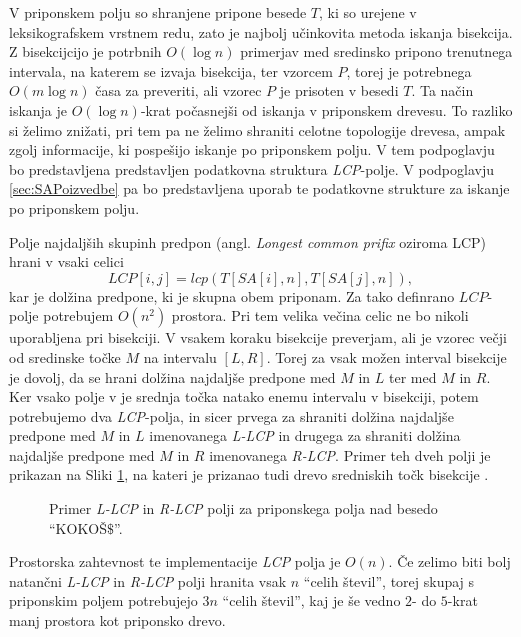 V priponskem polju so shranjene pripone besede $T$, ki so urejene v leksikografskem vrstnem redu, zato je najbolj učinkovita metoda iskanja bisekcija. Z bisekcijcijo je potrbnih $O(\log{n})$ primerjav med sredinsko pripono trenutnega intervala, na katerem se izvaja bisekcija, ter vzorcem $P$, torej je potrebnega $O(m\log{n})$ časa za preveriti, ali vzorec $P$ je prisoten v besedi $T$. Ta način iskanja je $O(\log{n})$-krat počasnejši od iskanja v priponskem drevesu. To razliko si želimo znižati, pri tem pa ne želimo shraniti celotne topologije drevesa, ampak zgolj informacije, ki pospešijo iskanje po priponskem polju. V tem podpoglavju bo predstavljena predstavljen podatkovna struktura \textit{LCP}-polje. V podpoglavju \ref{sec:SAPoizvedbe} pa bo predstavljena uporab te podatkovne strukture za iskanje po priponskem polju.

Polje najdaljših skupinh predpon (angl. \textit{Longest common prifix} oziroma LCP) hrani v vsaki celici 
    $$\textit{LCP}[i,j]=lcp(T[SA[i],n],T[SA[j],n]),$$
kar je dolžina predpone, ki je skupna obem priponam. Za tako definrano $LCP$-polje potrebujem $O(n^2)$ prostora. Pri tem velika večina celic ne bo nikoli uporabljena pri bisekciji. V vsakem koraku bisekcije preverjam, ali je vzorec večji od sredinske točke $M$ na intervalu $[L,R]$. Torej za vsak možen interval bisekcije je dovolj, da se hrani dolžina najdaljše predpone med $M$ in $L$ ter med $M$ in $R$. Ker vsako polje v je srednja točka natako enemu intervalu v bisekciji, potem potrebujemo dva \textit{LCP}-polja, in sicer prvega za shraniti dolžina najdaljše predpone med $M$ in $L$ imenovanega \textit{L-LCP} in drugega za shraniti dolžina najdaljše predpone med $M$ in $R$ imenovanega \textit{R-LCP}. Primer teh dveh polji je prikazan na Sliki \ref{fig:RlcpLlcpSuffuxArray}, na kateri je prizanao tudi drevo sredniskih točk bisekcije \cite{Manber1990}. 

\begin{figure}[htb] 
    
    \centering
    \caption{Primer \textit{L-LCP} in \textit{R-LCP} polji za priponskega polja nad besedo \enquote{KOKOŠ$\$$}.} 
    \label{fig:RlcpLlcpSuffuxArray}
\end{figure}

Prostorska zahtevnost te implementacije \textit{LCP} polja je $O(n)$. Če zelimo biti bolj natančni \textit{L-LCP} in \textit{R-LCP} polji hranita vsak $n$ \enquote{celih števil}, torej skupaj s priponskim poljem potrebujejo $3n$ \enquote{celih števil}, kaj je še vedno $2$- do $5$-krat manj prostora kot priponsko drevo.

